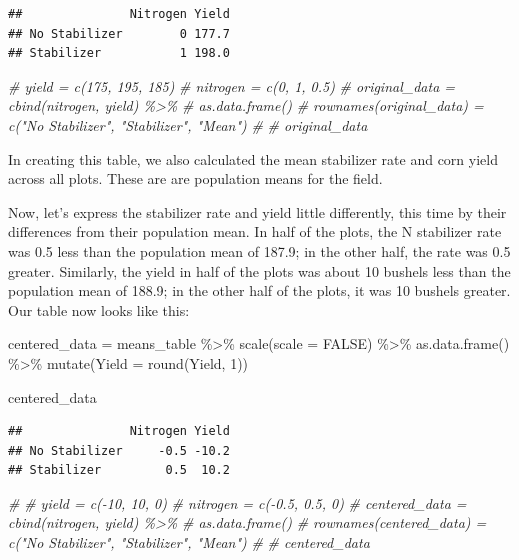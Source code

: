 \documentclass[
]{book}
\newenvironment{Shaded}{\begin{snugshade}}{\end{snugshade}}
\newcommand{\AttributeTok}[1]{\textcolor[rgb]{0.77,0.63,0.00}{#1}}
\newcommand{\CommentTok}[1]{\textcolor[rgb]{0.56,0.35,0.01}{\textit{#1}}}
\newcommand{\ConstantTok}[1]{\textcolor[rgb]{0.00,0.00,0.00}{#1}}
\newcommand{\DecValTok}[1]{\textcolor[rgb]{0.00,0.00,0.81}{#1}}
\newcommand{\FunctionTok}[1]{\textcolor[rgb]{0.00,0.00,0.00}{#1}}
\newcommand{\NormalTok}[1]{#1}
\newcommand{\OtherTok}[1]{\textcolor[rgb]{0.56,0.35,0.01}{#1}}
\newcommand{\SpecialCharTok}[1]{\textcolor[rgb]{0.00,0.00,0.00}{#1}}
\begin{document}
\begin{verbatim}
##               Nitrogen Yield
## No Stabilizer        0 177.7
## Stabilizer           1 198.0
\end{verbatim}

\begin{Shaded}
\begin{Highlighting}[]
\CommentTok{\# yield = c(175, 195, 185)}
\CommentTok{\# nitrogen = c(0, 1, 0.5)}
\CommentTok{\# original\_data = cbind(nitrogen, yield) \%\textgreater{}\%}
\CommentTok{\#   as.data.frame()}
\CommentTok{\# rownames(original\_data) = c("No Stabilizer", "Stabilizer", "Mean")}
\CommentTok{\# }
\CommentTok{\# original\_data}
\end{Highlighting}
\end{Shaded}

In creating this table, we also calculated the mean stabilizer rate and corn yield across all plots. These are are population means for the field.

Now, let's express the stabilizer rate and yield little differently, this time by their differences from their population mean. In half of the plots, the N stabilizer rate was 0.5 less than the population mean of 187.9; in the other half, the rate was 0.5 greater. Similarly, the yield in half of the plots was about 10 bushels less than the population mean of 188.9; in the other half of the plots, it was 10 bushels greater. Our table now looks like this:

\begin{Shaded}
\begin{Highlighting}[]
\NormalTok{centered\_data }\OtherTok{=}\NormalTok{ means\_table }\SpecialCharTok{\%\textgreater{}\%}
  \FunctionTok{scale}\NormalTok{(}\AttributeTok{scale =} \ConstantTok{FALSE}\NormalTok{) }\SpecialCharTok{\%\textgreater{}\%}
  \FunctionTok{as.data.frame}\NormalTok{() }\SpecialCharTok{\%\textgreater{}\%}
  \FunctionTok{mutate}\NormalTok{(}\AttributeTok{Yield =} \FunctionTok{round}\NormalTok{(Yield, }\DecValTok{1}\NormalTok{))}

\NormalTok{centered\_data}
\end{Highlighting}
\end{Shaded}

\begin{verbatim}
##               Nitrogen Yield
## No Stabilizer     -0.5 -10.2
## Stabilizer         0.5  10.2
\end{verbatim}

\begin{Shaded}
\begin{Highlighting}[]
\CommentTok{\# }
\CommentTok{\# yield = c({-}10, 10, 0)}
\CommentTok{\# nitrogen = c({-}0.5, 0.5, 0)}
\CommentTok{\# centered\_data = cbind(nitrogen, yield) \%\textgreater{}\%}
\CommentTok{\#   as.data.frame()}
\CommentTok{\# rownames(centered\_data) = c("No Stabilizer", "Stabilizer", "Mean")}
\CommentTok{\# }
\CommentTok{\# centered\_data}
\end{Highlighting}
\end{Shaded}
\end{document}
